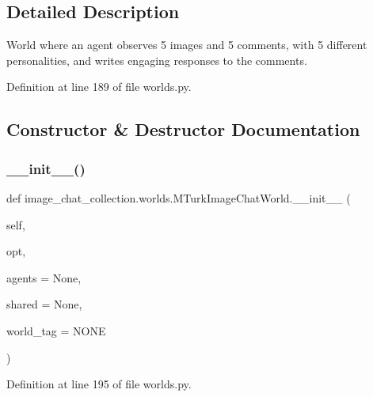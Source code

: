 \subsection{Detailed Description}
\begin{DoxyVerb}World where an agent observes 5 images and 5 comments, with 5 different
personalities, and writes engaging responses to the comments.
\end{DoxyVerb}
 

Definition at line 189 of file worlds.\+py.



\subsection{Constructor \& Destructor Documentation}
\mbox{\label{classimage__chat__collection_1_1worlds_1_1MTurkImageChatWorld_aa4c8a2169f71ac876be070a1c9c5cbdc}} 
\subsubsection{\texorpdfstring{\+\_\+\+\_\+init\+\_\+\+\_\+()}{\_\_init\_\_()}}
{\footnotesize\ttfamily def image\+\_\+chat\+\_\+collection.\+worlds.\+M\+Turk\+Image\+Chat\+World.\+\_\+\+\_\+init\+\_\+\+\_\+ (\begin{DoxyParamCaption}\item[{}]{self,  }\item[{}]{opt,  }\item[{}]{agents = {\ttfamily None},  }\item[{}]{shared = {\ttfamily None},  }\item[{}]{world\+\_\+tag = {\ttfamily \textquotesingle{}NONE\textquotesingle{}} }\end{DoxyParamCaption})}



Definition at line 195 of file worlds.\+py.


